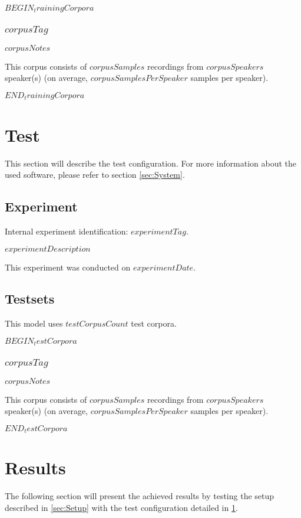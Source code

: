 \documentclass[a4paper,10pt,bibtotoc]{scrartcl}
\begin{document}
\begin{multicols}{2}
$BEGIN_trainingCorpora$
\subsubsection{$corpusTag$}

$corpusNotes$

This corpus consists of $corpusSamples$ recordings from $corpusSpeakers$ speaker(s) (on average, $corpusSamplesPerSpeaker$ samples per speaker).

$END_trainingCorpora$

\section{Test}
\label{sec:Test}

This section will describe the test configuration. For more information about the used software, please refer to section \ref{sec:System}.

\subsection{Experiment}

Internal experiment identification: $experimentTag$.

$experimentDescription$

This experiment was conducted on $experimentDate$.

\subsection{Testsets}
\label{sec:Testsets}

This model uses $testCorpusCount$ test corpora.

$BEGIN_testCorpora$
\subsubsection{$corpusTag$}
\label{sec:$SAVE_corpusTag$}

$corpusNotes$

This corpus consists of $corpusSamples$ recordings from $corpusSpeakers$ speaker(s) (on average, $corpusSamplesPerSpeaker$ samples per speaker).

$END_testCorpora$


\section{Results}

The following section will present the achieved results by testing the setup described in \ref{sec:Setup} with the test configuration detailed in \ref{sec:Test}.


\end{multicols}
\end{document}
